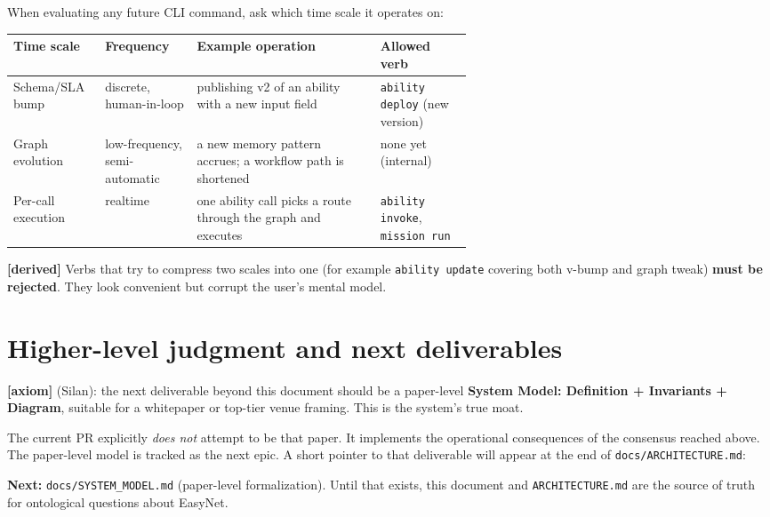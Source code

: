 \documentclass[11pt,a4paper]{article}
\newcommand{\axiom}{\textcolor{axiomcolor}{\textbf{[axiom]}}\xspace}
\newcommand{\derived}{\textcolor{derivedcolor}{\textbf{[derived]}}\xspace}
\begin{document}
When evaluating any future CLI command, ask which time scale it operates on:

\begin{center}
\renewcommand{\arraystretch}{1.3}
\begin{tabularx}{\linewidth}{L{0.20\linewidth} L{0.20\linewidth} X L{0.20\linewidth}}
\toprule
\textbf{Time scale} & \textbf{Frequency} & \textbf{Example operation} &
\textbf{Allowed verb} \\
\midrule
Schema/SLA bump & discrete, human-in-loop & publishing v2 of an ability with a
new input field & \texttt{ability deploy} (new version) \\
Graph evolution & low-frequency, semi-automatic & a new memory pattern
accrues; a workflow path is shortened & none yet (internal) \\
Per-call execution & realtime & one ability call picks a route through the
graph and executes & \texttt{ability invoke}, \texttt{mission run} \\
\bottomrule
\end{tabularx}
\end{center}

\derived{} Verbs that try to compress two scales into one (for example
\texttt{ability update} covering both v-bump and graph tweak) \textbf{must be
rejected}. They look convenient but corrupt the user's mental model.

\section{Higher-level judgment and next deliverables}
\label{sec:next}

\axiom{} (Silan): the next deliverable beyond this document should be a
paper-level \textbf{System Model: Definition + Invariants + Diagram},
suitable for a whitepaper or top-tier venue framing. This is the system's
true moat.

The current PR explicitly \emph{does not} attempt to be that paper. It
implements the operational consequences of the consensus reached above. The
paper-level model is tracked as the next epic. A short pointer to that
deliverable will appear at the end of \texttt{docs/ARCHITECTURE.md}:

\begin{notebox}
\textbf{Next:} \texttt{docs/SYSTEM\_MODEL.md} (paper-level formalization).
Until that exists, this document and \texttt{ARCHITECTURE.md} are the source
of truth for ontological questions about EasyNet.
\end{notebox}
\end{document}
